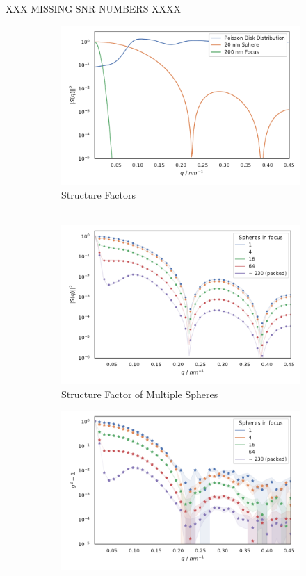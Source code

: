 XXX MISSING SNR NUMBERS XXXX
 
\begin{figure}
	\centering
	\begin{subfigure}[b]{0.32\textwidth}
		\includegraphics[width=\linewidth]{images/multisphere1.pdf}
		\caption{Structure Factors\\$ $}
		\label{fig:multisphere1}
	\end{subfigure}
	\begin{subfigure}[b]{0.32\textwidth}
		\includegraphics[width=\linewidth]{images/multisphere3.pdf}
		\caption{Structure Factor of Multiple Spheres}
		\label{fig:multisphere3}
	\end{subfigure}
	\begin{subfigure}[b]{0.32\textwidth}
		\includegraphics[width=\linewidth]{images/multisphere2.pdf}

\end{subfigure}
\end{figure}
